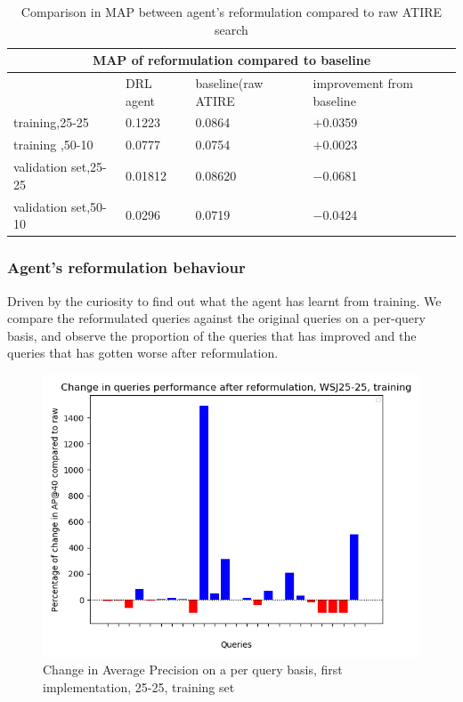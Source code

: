 \begin{table}[H]
\begin{tabular}{ |p{4cm}||p{3cm}|p{3cm}|p{3cm}|  }
	\hline
	\multicolumn{4}{|c|}{MAP of reformulation compared to baseline} \\
	
	\hline
	                                 & DRL agent                   &baseline(raw ATIRE& improvement from baseline\\
	\hline
		training,25-25    &0.1223                         &0.0864           & $+$0.0359\\
	training ,50-10    & 0.0777                        & 0.0754         & $+$0.0023\\

	\hline
	validation set,25-25 &0.01812                      &  0.08620         &   $-$0.0681         \\
validation set,50-10 & 0.0296                    & 0.0719           & $-$0.0424       \\
	\hline
	
	\end{tabular}
	\caption{\label{tab:MAP_of_splits_sys1}Comparison in MAP between agent's reformulation compared to raw ATIRE search}
\end{table}


\subsubsection{Agent's reformulation behaviour}

Driven by the curiosity to find out what the agent has learnt from training. We compare the reformulated queries against the original queries on a per-query basis, and observe the proportion of the queries that has improved and the queries that has gotten worse after reformulation.



\begin{figure}[H]
	\centering
	\includegraphics[width=0.7\linewidth]{images/chapter_4/first_system/per_query_improvment/25-25_train}
	\caption{Change in Average Precision on a per query basis, first implementation, 25-25, training set}
	\label{fig:25-25train}
\end{figure}


